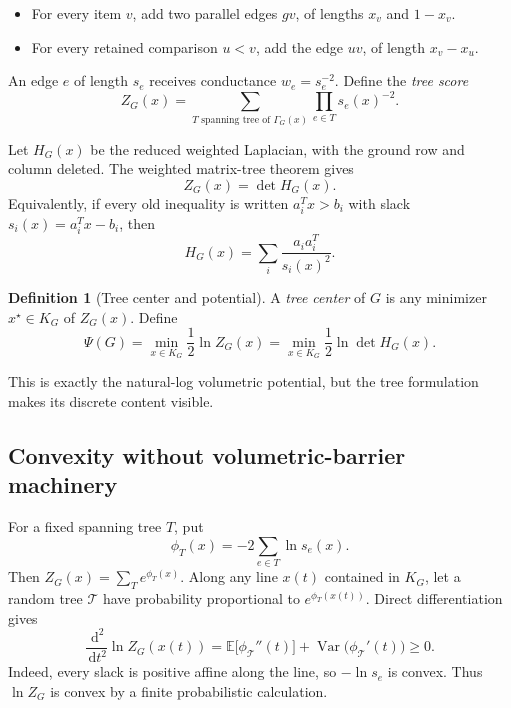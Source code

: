\documentclass[11pt]{article}
\theoremstyle{definition}
\newtheorem{definition}[theorem]{Definition}
\newcommand{\E}{\mathbb{E}}
\newcommand{\Var}{\operatorname{Var}}
\newcommand{\1}{\mathbf{1}}
\newcommand{\dd}{\,\mathrm{d}}
\begin{document}
\begin{itemize}[leftmargin=2em]
\item For every item $v$, add two parallel edges $gv$, of lengths $x_v$ and $1-x_v$.
\item For every retained comparison $u<v$, add the edge $uv$, of length $x_v-x_u$.
\end{itemize}

An edge $e$ of length $s_e$ receives conductance $w_e=s_e^{-2}$.  Define the \emph{tree score}
\begin{equation}
Z_G(x)=\sum_{T\text{ spanning tree of }\Gamma_G(x)}\prod_{e\in T}s_e(x)^{-2}.
\label{eq:tree-score}
\end{equation}

Let $H_G(x)$ be the reduced weighted Laplacian, with the ground row and column deleted.  The weighted matrix-tree theorem gives
\begin{equation}
Z_G(x)=\det H_G(x).
\label{eq:matrix-tree}
\end{equation}
Equivalently, if every old inequality is written $a_i^Tx>b_i$ with slack $s_i(x)=a_i^Tx-b_i$, then
\begin{equation}
H_G(x)=\sum_i\frac{a_i a_i^T}{s_i(x)^2}.
\label{eq:hessian}
\end{equation}

\begin{definition}[Tree center and potential]
A \emph{tree center} of $G$ is any minimizer $x^\star\in K_G$ of $Z_G(x)$.  Define
\begin{equation}
\Psi(G)=\min_{x\in K_G}\frac12\ln Z_G(x)
       =\min_{x\in K_G}\frac12\ln\det H_G(x).
\label{eq:potential}
\end{equation}
\end{definition}

This is exactly the natural-log volumetric potential, but the tree formulation makes its discrete content visible.

\subsection{Convexity without volumetric-barrier machinery}

For a fixed spanning tree $T$, put
\[
\phi_T(x)=-2\sum_{e\in T}\ln s_e(x).
\]
Then $Z_G(x)=\sum_T e^{\phi_T(x)}$.  Along any line $x(t)$ contained in $K_G$, let a random tree $\mathcal T$ have probability proportional to $e^{\phi_T(x(t))}$.  Direct differentiation gives
\begin{equation}
\frac{\dd^2}{\dd t^2}\ln Z_G(x(t))
 =\E\bigl[\phi_{\mathcal T}''(t)\bigr]
  +\Var\bigl(\phi_{\mathcal T}'(t)\bigr)
 \ge0.
\label{eq:tree-convexity}
\end{equation}
Indeed, every slack is positive affine along the line, so $-\ln s_e$ is convex.  Thus $\ln Z_G$ is convex by a finite probabilistic calculation.
\end{document}
